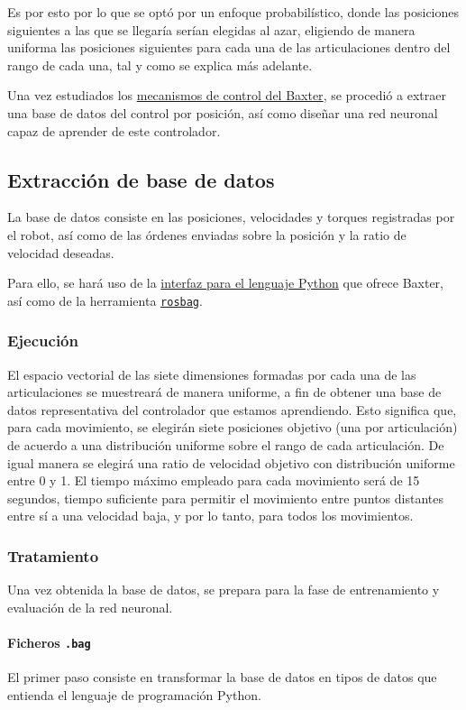 Es por esto por lo que se optó por un enfoque probabilístico, donde las posiciones siguientes a las que se llegaría serían elegidas al azar, eligiendo de manera uniforma las posiciones siguientes para cada una de las articulaciones dentro del rango de cada una, tal y como se explica más adelante.

Una vez estudiados los \hyperref[subsec:metodos/control_baxter]{mecanismos de control del Baxter}, se procedió a extraer una base de datos del control por posición, así como diseñar una red neuronal capaz de aprender de este controlador.

\subsection{Extracción de base de datos}
La base de datos consiste en las posiciones, velocidades y torques registradas por el robot, así como de las órdenes enviadas sobre la posición y la ratio de velocidad deseadas.

Para ello, se hará uso de la \hyperref[subsubsec:metodos/pythonAPI]{interfaz para el lenguaje Python} que ofrece Baxter, así como de la herramienta \hyperref[subsec:metodos/rosbag]{\texttt{rosbag}}.
\subsubsection{Ejecución}
El espacio vectorial de las siete dimensiones formadas por cada una de las articulaciones se muestreará de manera uniforme, a fin de obtener una base de datos representativa del controlador que estamos aprendiendo. Esto significa que, para cada movimiento, se elegirán siete posiciones objetivo (una por articulación) de acuerdo a una distribución uniforme sobre el rango de cada articulación. De igual manera se elegirá una ratio de velocidad objetivo con distribución uniforme entre 0 y 1. El tiempo máximo empleado para cada movimiento será de 15 segundos, tiempo suficiente para permitir el movimiento entre puntos distantes entre sí a una velocidad baja, y por lo tanto, para todos los movimientos.

\subsubsection{Tratamiento}
Una vez obtenida la base de datos, se prepara para la fase de entrenamiento y evaluación de la red neuronal.

\paragraph{Ficheros \texttt{.bag}}
El primer paso consiste en transformar la base de datos en tipos de datos que entienda el lenguaje de programación Python.

